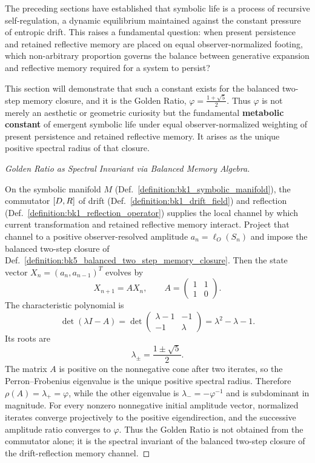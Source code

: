 The preceding sections have established that symbolic life is a process of recursive self-regulation, a dynamic equilibrium maintained against the constant pressure of entropic drift. This raises a fundamental question: when present persistence and retained reflective memory are placed on equal observer-normalized footing, which non-arbitrary proportion governs the balance between generative expansion and reflective memory required for a system to persist?

This section will demonstrate that such a constant exists for the balanced two-step memory closure, and it is the Golden Ratio, $\varphi = \frac{1 + \sqrt{5}}{2}$. Thus $\varphi$ is not merely an aesthetic or geometric curiosity but the fundamental \textbf{metabolic constant} of emergent symbolic life under equal observer-normalized weighting of present persistence and retained reflective memory. It arises as the unique positive spectral radius of that closure.



\begin{proof}[Golden Ratio as Spectral Invariant via Balanced Memory Algebra]
\label{proof:bk5_golden_ratio_spectral_invariant}
\leavevmode

On the symbolic manifold $M$ (Def.~\ref{definition:bk1_symbolic_manifold}), the
commutator $[D,R]$ of drift
(Def.~\ref{definition:bk1_drift_field}) and reflection
(Def.~\ref{definition:bk1_reflection_operator}) supplies the local channel by
which current transformation and retained reflective memory interact.  Project
that channel to a positive observer-resolved amplitude $a_n=\ell_O(S_n)$ and
impose the balanced two-step closure of
Def.~\ref{definition:bk5_balanced_two_step_memory_closure}.  Then the state
vector $X_n=(a_n,a_{n-1})^T$ evolves by
\[
X_{n+1}=A X_n,\qquad
A=\begin{pmatrix}1&1\\1&0\end{pmatrix}.
\]
The characteristic polynomial is
\[
\det(\lambda I-A)
=\det\begin{pmatrix}\lambda-1&-1\\-1&\lambda\end{pmatrix}
=\lambda^2-\lambda-1.
\]
Its roots are
\[
\lambda_\pm=\frac{1\pm\sqrt{5}}{2}.
\]
The matrix $A$ is positive on the nonnegative cone after two iterates, so the
Perron--Frobenius eigenvalue is the unique positive spectral radius.  Therefore
$\rho(A)=\lambda_+=\varphi$, while the other eigenvalue is
$\lambda_-=-\varphi^{-1}$ and is subdominant in magnitude.  For every
nonzero nonnegative initial amplitude vector, normalized iterates converge
projectively to the positive eigendirection, and the successive amplitude ratio
converges to $\varphi$.  Thus the Golden Ratio is not obtained from the
commutator alone; it is the spectral invariant of the balanced two-step closure
of the drift-reflection memory channel.
\end{proof}

